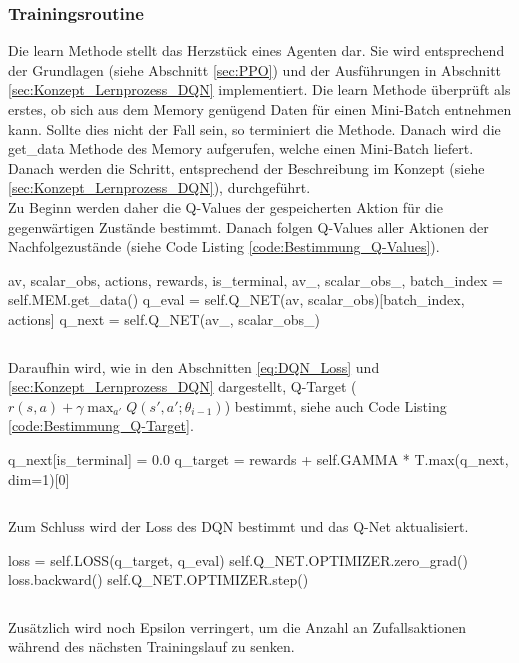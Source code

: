 \subsubsection{Trainingsroutine} \label{sec:Implementierung_learn_DQN}
Die learn Methode stellt das Herzstück eines Agenten dar. Sie wird entsprechend der Grundlagen (siehe Abschnitt \ref{sec:PPO}) und der Ausführungen in Abschnitt \ref{sec:Konzept_Lernprozess_DQN} implementiert.
Die learn Methode überprüft als erstes, ob sich aus dem Memory genügend Daten für einen Mini-Batch entnehmen kann. Sollte dies nicht der Fall sein, so terminiert die Methode.
Danach wird die get\_data Methode des Memory aufgerufen, welche einen Mini-Batch liefert. Danach werden die Schritt, entsprechend der Beschreibung im Konzept (siehe \ref{sec:Konzept_Lernprozess_DQN}), durchgeführt.\\
Zu Beginn werden daher die Q-Values der gespeicherten Aktion für die gegenwärtigen Zustände bestimmt. Danach folgen Q-Values aller Aktionen der Nachfolgezustände (siehe Code Listing \ref{code:Bestimmung_Q-Values}).
\begin{python}
av, scalar_obs, actions, rewards, is_terminal, av_, scalar_obs_, batch_index = self.MEM.get_data()
q_eval = self.Q_NET(av, scalar_obs)[batch_index, actions]
q_next = self.Q_NET(av_, scalar_obs_)
\end{python}
\begin{lstlisting}[caption=Bestimmung der Q-Values, label=code:Bestimmung_Q-Values]
\end{lstlisting}
Daraufhin wird, wie in den Abschnitten \ref{eq:DQN_Loss} und \ref{sec:Konzept_Lernprozess_DQN} dargestellt, Q-Target ($r(s,a) +\gamma \max_{a'}Q(s',a';\theta_{i-1})$) bestimmt, siehe auch Code Listing \ref{code:Bestimmung_Q-Target}.
\begin{python}
q_next[is_terminal] = 0.0
q_target = rewards + self.GAMMA * T.max(q_next, dim=1)[0]
\end{python}
\begin{lstlisting}[caption=Bestimmung von Q-Target, label=code:Bestimmung_Q-Target]
\end{lstlisting}
Zum Schluss wird der Loss des DQN bestimmt und das Q-Net aktualisiert.
\begin{python}
loss = self.LOSS(q_target, q_eval)
self.Q_NET.OPTIMIZER.zero_grad()
loss.backward()
self.Q_NET.OPTIMIZER.step()
\end{python}
\begin{lstlisting}[caption=Bestimmung des DQN Loss \& Update des Q-Networks, label=code:Bestimmung_DQN-Loss]
\end{lstlisting}
Zusätzlich wird noch Epsilon verringert, um die Anzahl an Zufallsaktionen während des nächsten Trainingslauf zu senken.

